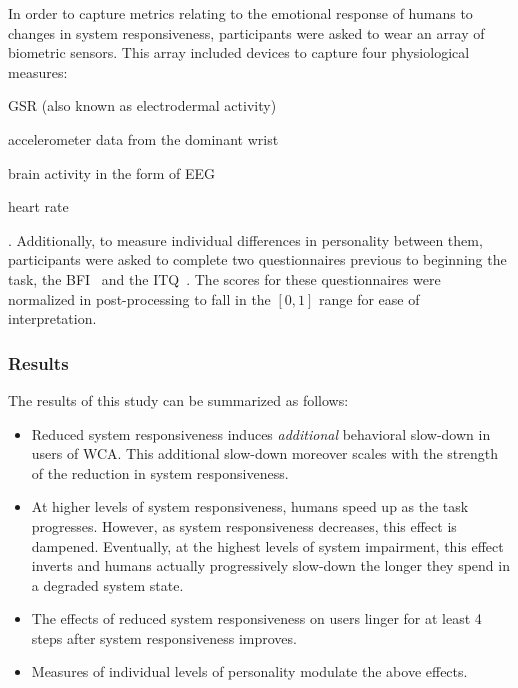 In order to capture metrics relating to the emotional response of humans to changes in system responsiveness, participants were asked to wear an array of biometric sensors.
This array included devices to capture four physiological measures:
\begin{enumerate*}[itemjoin={{, }}, itemjoin*={{, and }}, label={(\arabic*)}]
    \item \gls{GSR} (also known as electrodermal activity)
    \item accelerometer data from the dominant wrist
    \item brain activity in the form of \gls{EEG}
    \item heart rate
\end{enumerate*}.
Additionally, to measure individual differences in personality between them, participants were asked to complete two questionnaires previous to beginning the task, the \gls{BFI}~\cite{john1999big} and the \gls{ITQ}~\cite{witmer1998measuring}.
The scores for these questionnaires were normalized in post-processing to fall in the \ensuremath{[0, 1]} range for ease of interpretation.

\subsubsection{Results}

The results of this study can be summarized as follows:

\begin{itemize}
    \item Reduced system responsiveness induces \emph{additional} behavioral slow-down in users of \gls{WCA}.
    This additional slow-down moreover scales with the strength of the reduction in system responsiveness.

    \item At higher levels of system responsiveness, humans speed up as the task progresses.
    However, as system responsiveness decreases, this effect is dampened.
    Eventually, at the highest levels of system impairment, this effect inverts and humans actually progressively slow-down the longer they spend in a degraded system state.

    \item The effects of reduced system responsiveness on users linger for at least \num{4} steps after system responsiveness improves.
    \item Measures of individual levels of personality modulate the above effects.
\end{itemize}

